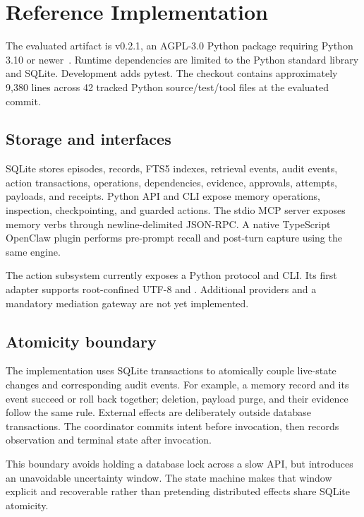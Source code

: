 \section{Reference Implementation}

The evaluated artifact is \system{} v0.2.1, an AGPL-3.0 Python package requiring Python 3.10 or newer~\cite{aetnamem2026}. Runtime dependencies are limited to the Python standard library and SQLite. Development adds pytest. The checkout contains approximately 9,380 lines across 42 tracked Python source/test/tool files at the evaluated commit.

\subsection{Storage and interfaces}

SQLite stores episodes, records, FTS5 indexes, retrieval events, audit events, action transactions, operations, dependencies, evidence, approvals, attempts, payloads, and receipts. Python API and CLI expose memory operations, inspection, checkpointing, and guarded actions. The stdio MCP server exposes memory verbs through newline-delimited JSON-RPC. A native TypeScript OpenClaw plugin performs pre-prompt recall and post-turn capture using the same engine.

The action subsystem currently exposes a Python protocol and CLI. Its first adapter supports root-confined UTF-8  and . Additional providers and a mandatory mediation gateway are not yet implemented.

\subsection{Atomicity boundary}

The implementation uses SQLite transactions to atomically couple live-state changes and corresponding audit events. For example, a memory record and its  event succeed or roll back together; deletion, payload purge, and their evidence follow the same rule. External effects are deliberately outside database transactions. The coordinator commits intent before invocation, then records observation and terminal state after invocation.

This boundary avoids holding a database lock across a slow API, but introduces an unavoidable uncertainty window. The state machine makes that window explicit and recoverable rather than pretending distributed effects share SQLite atomicity.

